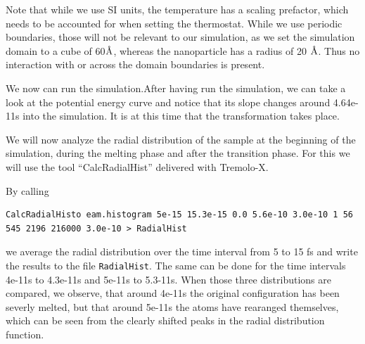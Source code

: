 Note that while we use SI units, the temperature has a scaling prefactor, which needs to be accounted for when setting the thermostat. While we use periodic boundaries, those will not be relevant to our simulation, as we 
set the simulation domain to a cube of 60$\text{\normalfont\AA}$, whereas the nanoparticle has a radius of 20 $\text{\normalfont\AA}$. Thus no interaction with or across the domain boundaries is present.

We now can run the simulation.After having run the simulation, we can take a look at the potential energy curve and notice that its slope changes around 4.64e-11s into the simulation. It is at this time that
the transformation takes place.

We will now analyze the radial distribution of the sample at the beginning of the simulation, during the melting phase and after the transition phase.
For this we will use the tool ``CalcRadialHist'' delivered with Tremolo-X.

By calling 
\begin{lstlisting}
CalcRadialHisto eam.histogram 5e-15 15.3e-15 0.0 5.6e-10 3.0e-10 1 56 545 2196 216000 3.0e-10 > RadialHist
\end{lstlisting}
we average the radial distribution over the time interval from 5 to 15 fs and write the results to the file {\tt RadialHist}.
The same can be done for the time intervals 4e-11s to 4.3e-11s and  5e-11s to 5.3-11s. When those three distributions are compared,
we observe, that around 4e-11s the original configuration has been severly melted, but that around 5e-11s the atoms have rearanged themselves, 
which can be seen from the clearly shifted peaks in the radial distribution function.



